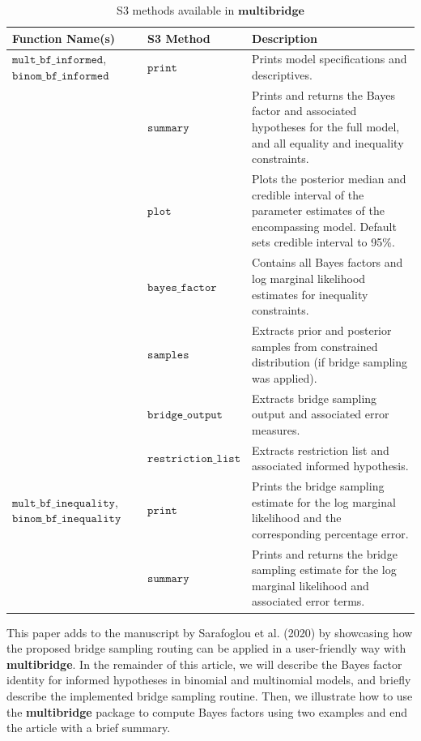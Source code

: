 \documentclass[
  english,
  man,floatsintext]{apa6}
\begin{document}
\begin{table}[H]
\caption {S3 methods available in $\textbf{multibridge}$}
\label{table:s3_methods}
\begin{center}
\begin{tabular}{p{4cm}p{3.5cm}p{9cm}}
        \toprule
Function Name(s) & S3 Method & Description \\\midrule
$\texttt{mult\_bf\_informed}$, $\texttt{binom\_bf\_informed}$ & $\texttt{print}$ & Prints model specifications and descriptives. \\
 & $\texttt{summary}$ &  Prints and returns the Bayes factor and associated hypotheses for the full model, and all equality and inequality constraints.\\
  & $\texttt{plot}$ &  Plots the posterior median and credible interval of the parameter estimates of the encompassing model. Default sets credible interval to 95\%.\\
 & $\texttt{bayes\_factor}$ & Contains all Bayes factors and log marginal likelihood estimates for inequality constraints.\\
 & $\texttt{samples}$ & Extracts prior and posterior samples from constrained distribution (if bridge sampling was applied). \\
& $\texttt{bridge\_output}$    &  Extracts bridge sampling output and associated error measures.\\
& $\texttt{restriction\_list}$ & Extracts restriction list and associated informed hypothesis. \\
$\texttt{mult\_bf\_inequality}$, $\texttt{binom\_bf\_inequality}$  & $\texttt{print}$ & Prints the bridge sampling estimate for the log marginal likelihood and the corresponding percentage error. \\
& $\texttt{summary}$ & Prints and returns the bridge sampling estimate for the log marginal likelihood and associated error terms.\\
\bottomrule
\end{tabular}
\end{center}
\end{table}

This paper adds to the manuscript by Sarafoglou et al. (2020) by showcasing how the proposed bridge sampling routing can be applied in a user-friendly way with \textbf{multibridge}. In the remainder of this article, we will describe the Bayes factor identity for informed hypotheses in binomial and multinomial models, and briefly describe the implemented bridge sampling routine. Then, we illustrate how to use the \textbf{multibridge} package to compute Bayes factors using two examples and end the article with a brief summary.
\end{document}
